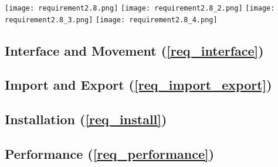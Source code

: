 \FloatBarrier
\begin{figure*}[htp]
	\centering
	\texttt{[image: requirement2.8.png]}
	\texttt{[image: requirement2.8\_2.png]}
	\texttt{[image: requirement2.8\_3.png]}
	\texttt{[image: requirement2.8\_4.png]}
\end{figure*}
\FloatBarrier

\subsection{Interface and Movement (\ref{req_interface})}

\subsection{Import and Export (\ref{req_import_export})}
	
\subsection{Installation (\ref{req_install})}

\subsection{Performance (\ref{req_performance})}
		

